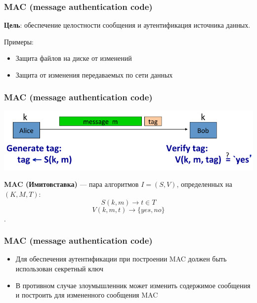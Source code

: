 \documentclass{beamer}
\newcommand{\define}[2]{{\bf #1} --- #2.\vspace{1em}}
\newcommand{\set}[1]{{\lbrace #1 \rbrace}}
\begin{document}
\begin{frame}
  \frametitle{MAC (message authentication code)}

  \textbf{Цель}: обеспечение целостности сообщения и аутентификация источника данных.
  
  \vspace{1em}

  \begin{block}{Примеры:}
    \begin{itemize}
      \item{Защита файлов на диске от изменений}
      \item{Защита от изменения передаваемых по сети данных}
    \end{itemize}
  \end{block}

\end{frame}


\begin{frame}
  \frametitle{MAC (message authentication code)}

  \includegraphics[width=\linewidth]{./images/png/MAC_protocol.png}

  \define{\textbf{MAC} (Имитовставка)} {пара алгоритмов $I=(S, V)$, определенных на $(K,M,T)$:
    \[ S(k,m) \rightarrow t \in T \]
    \[ V(k,m,t) \rightarrow \set{yes, no} \]
  }
  
\end{frame}


\begin{frame}
  \frametitle{MAC (message authentication code)}

  \begin{itemize}
    \item{Для обеспечения аутентификации при построении MAC должен быть использован секретный ключ}
    \item{В противном случае злоумышленник может изменить содержимое сообщения и построить для измененного сообщения MAC}
  \end{itemize}

\end{frame}
\end{document}
